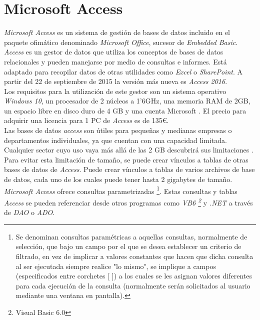 \documentclass[11pt,a4paper]{article}
\begin{document}
\newpage 

\section{Microsoft Access}
\emph{Microsoft Access} es un sistema de gestión de bases de datos incluido en el paquete ofimático denominado \emph{Microsoft Office}, sucesor de \emph{Embedded Basic}. \emph{Access} es un gestor de datos que utiliza los conceptos de bases de datos relacionales y pueden manejarse por medio de consultas e informes. Está adaptado para recopilar datos de otras utilidades como \emph{Excel} o \emph{SharePoint}. A partir del 22 de septiembre de 2015 la versión más nueva es \emph{Access 2016}. \cite{ACC:1} \\

Los requisitos para la utilización de este gestor son un sistema operativo \emph{Windows 10}, un procesador de 2 núcleos a 1'6GHz, una memoria RAM de 2GB, un espacio libre en disco duro de 4 GB y una cuenta Microsoft \cite{ACC:2}. El precio para adquirir una licencia para 1 PC de \emph{Access} es de 135€. \cite{ACC:3} \\

Las bases de datos \emph{access} son útiles para pequeñas y medianas empresas o departamentos individuales, ya que cuentan con una capacidad limitada. Cualquier sector cuyo uso vaya más allá de las 2 GB descubrirá sus limitaciones \cite{ACC:4}. Para evitar esta limitación de tamaño, se puede crear vínculos a tablas de otras bases de datos de \emph{Access}. Puede crear vínculos a tablas de varios archivos de base de datos, cada uno de los cuales puede tener hasta 2 gigabytes de tamaño. \cite{ACC:5}\\

\emph{Microsoft Access} ofrece consultas parametrizadas \footnote{Se denominan consultas paramétricas a aquellas consultas, normalmente de selección, que bajo un campo por el que se desea establecer un criterio de filtrado, en vez de implicar a valores constantes que hacen que dicha consulta al ser ejecutada siempre realice "lo mismo", se implique a campos (especificados entre corchetes [ ]) a los cuales se les asignan valores diferentes para cada ejecución de la consulta (normalmente serán solicitados al usuario mediante una ventana en pantalla).\cite{ACC:7}}. Estas consultas y tablas \emph{Access} se pueden referenciar desde otros programas como \emph{VB6 \footnote{Visual Basic 6.0}} y \emph{.NET} a través de \emph{DAO} o \emph{ADO}. \cite{ACC:6}\\
\end{document}

